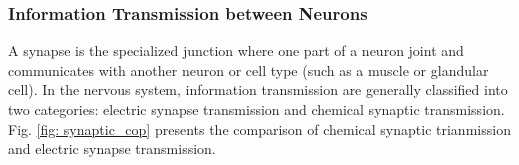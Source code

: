 \documentclass[journal,comsoc]{IEEEtran}
\begin{document}
			\subsubsection{Information Transmission between Neurons}
				A synapse is the specialized junction where one part of a neuron joint and communicates with another neuron or cell type (such as a muscle or glandular cell). 
				In the nervous system, information transmission are generally classified into two categories: electric synapse transmission and chemical synaptic transmission.
				Fig. \ref{fig: synaptic_cop} presents the comparison of chemical synaptic trianmission and electric synapse transmission.
				\begin{figure}[htbp]
					\centering

\end{figure}
\end{document}
